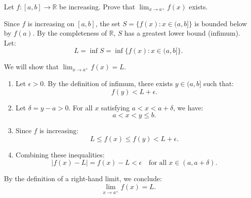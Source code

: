 \documentclass[answers,12pt,addpoints]{exam}
\begin{document}
\begin{questions}
    \question Let $f : [a, b] \to \mathbb{R}$ be increasing. Prove that $\lim_{x \to a^+} f(x)$ exists.
    \begin{solution}
        Since \( f \) is increasing on \([a, b]\), the set \( S = \{f(x) : x \in (a, b]\} \) is bounded below by \( f(a) \). By the completeness of \( \mathbb{R} \), \( S \) has a greatest lower bound (infimum). Let:
\[
L = \inf S = \inf \{f(x) : x \in (a, b]\}.
\]

We will show that \( \lim_{x \to a^+} f(x) = L \).

\begin{enumerate}
    \item Let \( \epsilon > 0 \). By the definition of infimum, there exists \( y \in (a, b] \) such that:
    \[
    f(y) < L + \epsilon.
    \]
    
    \item Let \( \delta = y - a > 0 \). For all \( x \) satisfying \( a < x < a + \delta \), we have:
    \[
    a < x < y \leq b.
    \]
    
    \item Since \( f \) is increasing:
    \[
    L \leq f(x) \leq f(y) < L + \epsilon.
    \]
    
    \item Combining these inequalities:
    \[
    |f(x) - L| = f(x) - L < \epsilon \quad \text{for all } x \in (a, a + \delta).
    \]
\end{enumerate}

By the definition of a right-hand limit, we conclude:
\[
\lim_{x \to a^+} f(x) = L. \]
    \end{solution}
\end{questions}
\end{document}
